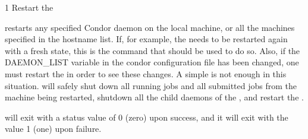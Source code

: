 \begin{ManPage}{\label{man-condor-restart}}{1}
{Restart the }
\Synopsis {}
\ToolArgs


\Description 

 restarts any specified Condor daemon on the local
machine, or all the machines specified in the hostname list.  If, for
example, the  needs to be restarted again with
a fresh state, this is the command that should be used to do so.
Also, if the DAEMON\_LIST variable in the condor configuration file has
been changed, one must restart the  in order to see these
changes.  A simple  is not enough in this situation.
 will safely shut down all running jobs and all submitted
jobs from the machine being restarted, shutdown all the child daemons
of the , and restart the .

\begin{Options}
	\ToolArgsDesc
\end{Options}

\ExitStatus

 will exit with a status value of 0 (zero) upon success,
and it will exit with the value 1 (one) upon failure.

\end{ManPage}
